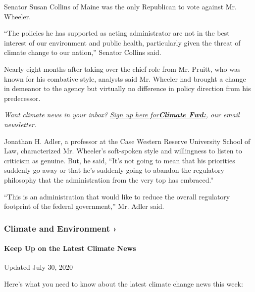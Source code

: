 Senator Susan Collins of Maine was the only Republican to vote against
Mr. Wheeler.

``The policies he has supported as acting administrator are not in the
best interest of our environment and public health, particularly given
the threat of climate change to our nation,'' Senator Collins said.

Nearly eight months after taking over the chief role from Mr. Pruitt,
who was known for his combative style, analysts said Mr. Wheeler had
brought a change in demeanor to the agency but virtually no difference
in policy direction from his predecessor.

\emph{Want climate news in your inbox?}
\href{https://www.nytimes.com/newsletters/climate-change}{\emph{Sign up
here
for}}\textbf{\href{https://www.nytimes.com/newsletters/climate-change}{\emph{Climate
Fwd:}}}\emph{, our email newsletter.}

Jonathan H. Adler, a professor at the Case Western Reserve University
School of Law, characterized Mr. Wheeler's soft-spoken style and
willingness to listen to criticism as genuine. But, he said, ``It's not
going to mean that his priorities suddenly go away or that he's suddenly
going to abandon the regulatory philosophy that the administration from
the very top has embraced.''

``This is an administration that would like to reduce the overall
regulatory footprint of the federal government,'' Mr. Adler said.

\href{https://www.nytimes.com/section/climate?action=click\&pgtype=Article\&state=default\&region=MAIN_CONTENT_1\&context=storylines_keepup}{}

\hypertarget{climate-and-environment-}{%
\subsubsection{Climate and Environment
›}\label{climate-and-environment-}}

\hypertarget{keep-up-on-the-latest-climate-news}{%
\paragraph{Keep Up on the Latest Climate
News}\label{keep-up-on-the-latest-climate-news}}

Updated July 30, 2020

Here's what you need to know about the latest climate change news this
week:

